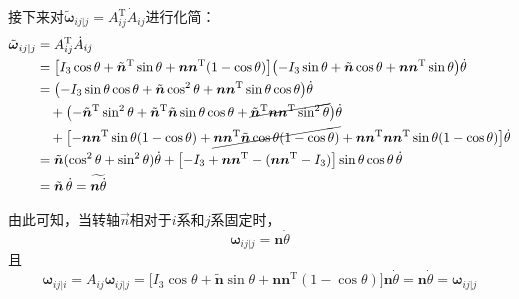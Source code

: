 接下来对$\tilde{\boldsymbol{\omega}}_{ij|j} = A_{ij}^{\mathrm{T}}\dot{A}_{ij}$进行化简：
\begin{align}
\tilde{\boldsymbol{\omega}}_{ij|j} &= A_{ij}^{\mathrm{T}}\dot{A}_{ij} \nonumber\\
&= \bigl[I_3\cos\theta + \tilde{\boldsymbol{n}}^{\mathrm{T}}\sin\theta + \boldsymbol{n}\boldsymbol{n}^{\mathrm{T}}(1 - \cos\theta)\bigr]
   \bigl(-I_3\sin\theta + \tilde{\boldsymbol{n}}\cos\theta + \boldsymbol{n}\boldsymbol{n}^{\mathrm{T}}\sin\theta\bigr)\dot{\theta} \nonumber\\
&= \bigl(-I_3\sin\theta\cos\theta + \tilde{\boldsymbol{n}}\cos^2\theta + \boldsymbol{n}\boldsymbol{n}^{\mathrm{T}}\sin\theta\cos\theta\bigr)\dot{\theta} \nonumber\\
&\quad + \bigl(-\tilde{\boldsymbol{n}}^{\mathrm{T}}\sin^2\theta + \tilde{\boldsymbol{n}}^{\mathrm{T}}\tilde{\boldsymbol{n}}\sin\theta\cos\theta + \cancel{\tilde{\boldsymbol{n}}^{\mathrm{T}}\boldsymbol{n}\boldsymbol{n}^{\mathrm{T}}\sin^2\theta}\bigr)\dot{\theta} \nonumber\\
&\quad + \bigl[-\boldsymbol{n}\boldsymbol{n}^{\mathrm{T}}\sin\theta(1 - \cos\theta)
       + \cancel{\boldsymbol{n}\boldsymbol{n}^{\mathrm{T}}\tilde{\boldsymbol{n}}\cos\theta(1 - \cos\theta)}
       + \boldsymbol{n}\boldsymbol{n}^{\mathrm{T}}\boldsymbol{n}\boldsymbol{n}^{\mathrm{T}}\sin\theta(1 - \cos\theta)\bigr]\dot{\theta} \nonumber\\
&= \tilde{\boldsymbol{n}}(\cos^2\theta + \sin^2\theta)\dot{\theta}
   + \bigl[-I_3 + \boldsymbol{n}\boldsymbol{n}^{\mathrm{T}} - (\boldsymbol{n}\boldsymbol{n}^{\mathrm{T}} - I_3)\bigr]\sin\theta\cos\theta\,\dot{\theta} \nonumber\\
&= \tilde{\boldsymbol{n}}\,\dot{\theta}
   = \widetilde{\boldsymbol{n}\dot{\theta}}
\end{align}

\begin{myformula}
由此可知，当转轴$\vec{n}$相对于$i$系和$j$系固定时，
\begin{equation}
\boldsymbol{\omega}_{ij|j} = \boldsymbol{n}\dot{\theta}
\label{eq:7.18}
\end{equation}
且
\begin{equation}
\boldsymbol{\omega}_{ij|i} = A_{ij}\boldsymbol{\omega}_{ij|j}
= \bigl[I_3\cos\theta + \tilde{\boldsymbol{n}}\sin\theta + \boldsymbol{n}\boldsymbol{n}^{\mathrm{T}}(1 - \cos\theta)\bigr]\boldsymbol{n}\dot{\theta}
= \boldsymbol{n}\dot{\theta} = \boldsymbol{\omega}_{ij|j}
\label{eq:7.19}
\end{equation}
\end{myformula}

